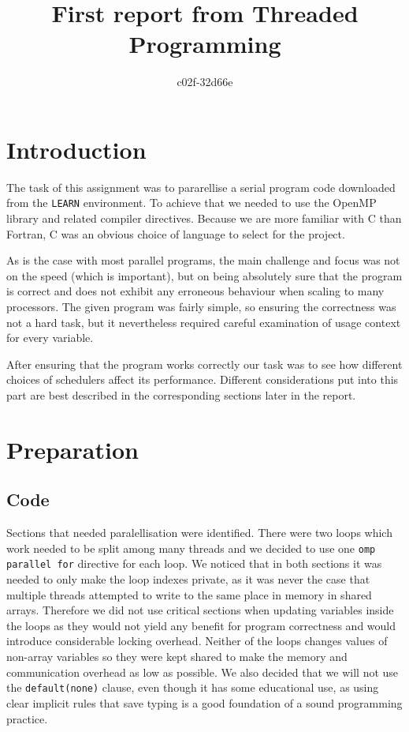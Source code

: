 \documentclass[11pt,a4paper]{article}
\begin{document}
\title{First report from Threaded Programming}
\author{c02f-32d66e}
\maketitle

\section{Introduction}
The task of this assignment was to pararellise a serial program code downloaded from the \texttt{LEARN} environment. To achieve that we needed to use the OpenMP library and related compiler directives. Because we are more familiar with C than Fortran, C was an obvious choice of language to select for the project. 

As is the case with most parallel programs, the main challenge and focus was not on the speed (which is important), but on being absolutely sure that the program is correct and does not exhibit any erroneous behaviour when scaling to many processors. The given program was fairly simple, so ensuring the correctness was not a hard task, but it nevertheless required careful examination of usage context for every variable.

After ensuring that the program works correctly our task was to see how different choices of schedulers affect its performance. Different considerations put into this part are best described in the corresponding sections later in the report.

\section{Preparation}
\subsection{Code}
Sections that needed paralellisation were identified. There were two loops which work needed to be split among many threads and we decided to use one \texttt{omp parallel for} directive for each loop. We noticed that in both sections it was needed to only make the loop indexes private, as it was never the case that multiple threads attempted to write to the same place in memory in shared arrays. Therefore we did not use critical sections when updating variables inside the loops as they would not yield any benefit for program correctness and would introduce considerable locking overhead. Neither of the loops changes values of non-array variables so they were kept shared to make the memory and communication overhead as low as possible. We also decided that we will not use the \texttt{default(none)} clause, even though it has some educational use, as using clear implicit rules that save typing is a good foundation of a sound programming practice.
\end{document}
